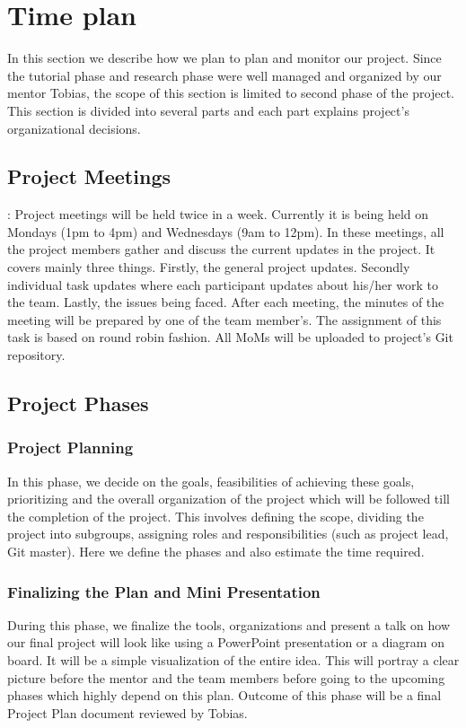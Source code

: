 \documentclass[titlepage]{report}
\begin{document}

\chapter{Time plan}
In this section we describe how we plan to plan and monitor our project. Since the tutorial phase and research phase were well managed and organized by our mentor Tobias, the scope of this section is limited to second phase of the project. This section is divided into several parts and each part explains project’s organizational decisions. 

\section{Project Meetings}
: Project meetings will be held twice in a week. Currently it is being held on Mondays (1pm to 4pm) and Wednesdays (9am to 12pm). In these meetings, all the project members gather and discuss the current updates in the project. It covers mainly three things. Firstly, the general project updates. Secondly individual task updates where each participant updates about his/her work to the team. Lastly, the issues being faced. 
After each meeting, the minutes of the meeting will be prepared by one of the team member’s. The assignment of this task is based on round robin fashion. All MoMs will be uploaded to project’s Git repository.


\section{Project Phases}
\subsection{Project Planning}
In this phase, we decide on the goals, feasibilities of achieving these goals, prioritizing and the overall organization of the project which will be followed till the completion of the project. This involves defining the scope, dividing the project into subgroups, assigning roles and responsibilities (such as project lead, Git master). Here we define the phases and also estimate the time required. 

\subsection{Finalizing the Plan and Mini Presentation}
During this phase, we finalize the tools, organizations and present a talk on how our final project will look like using a PowerPoint presentation or a diagram on board. It will be a simple visualization of the entire idea. This will portray a clear picture before the mentor and the team members before going to the upcoming phases which highly depend on this plan. Outcome of this phase will be a final Project Plan document reviewed by Tobias. 
\end{document}

